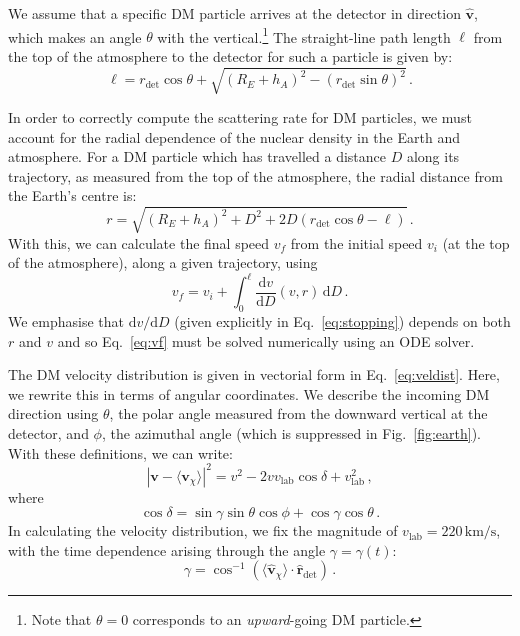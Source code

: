 \documentclass[prd,twocolumn,showpacs,nofootinbib,aps]{revtex4-1}
\begin{document}
We assume that a specific DM particle arrives at the detector in direction $\hat{\mathbf{v}}$, which makes an angle $\theta$ with the vertical.\footnote{Note that $\theta = 0$ corresponds to an \textit{upward}-going DM particle.} The straight-line path length $\ell$ from the top of the atmosphere to the detector for such a particle is given by:
\begin{equation}
\ell = r_\mathrm{det} \cos\theta + \sqrt{(R_E + h_A)^2 - (r_\mathrm{det} \sin\theta)^2 }\,.
\end{equation}

In order to correctly compute the scattering rate for DM particles, we must account for the radial dependence of the nuclear density in the Earth and atmosphere. For a DM particle which has travelled a distance $D$ along its trajectory, as measured from the top of the atmosphere, the radial distance from the Earth's centre is:
\begin{equation}
r = \sqrt{(R_E + h_A)^2 + D^2 + 2D(r_\mathrm{det}\cos\theta - \ell)}\,.
\end{equation}
With this, we can calculate the final speed $v_f$ from the initial speed $v_i$ (at the top of the atmosphere), along a given trajectory, using
\begin{equation}
\label{eq:vf}
v_f = v_i + \int_0^{\ell} \frac{\mathrm{d}v}{\mathrm{d}D}(v, r) \,\mathrm{d}D\,.
\end{equation}
We emphasise that  $\mathrm{d}v/\mathrm{d}D$ (given explicitly in Eq.~\eqref{eq:stopping}) depends on both $r$ and $v$ and so Eq.~\eqref{eq:vf} must be solved numerically using an ODE solver.

The DM velocity distribution is given in vectorial form in Eq.~\eqref{eq:veldist}. Here, we rewrite this in terms of angular coordinates. We describe the incoming DM direction using $\theta$, the polar angle measured from the downward vertical at the detector, and $\phi$, the azimuthal angle (which is suppressed in Fig.~\ref{fig:earth}). With these definitions, we can write:
\begin{equation}
|\mathbf{v} - \langle \mathbf{v}_\chi\rangle|^2 = v^2 - 2vv_\mathrm{lab} \cos\delta + v_\mathrm{lab}^2\,,
\end{equation}
where 
\begin{equation}
\cos\delta = \sin\gamma \sin\theta \cos\phi + \cos\gamma \cos\theta\,.
\end{equation}
In calculating the velocity distribution, we fix the magnitude of $v_\mathrm{lab} = 220 \,\mathrm{km/s}$, with the time dependence arising through the angle $\gamma = \gamma(t)$:
\begin{equation}
\gamma = \cos^{-1}\left(\langle \hat{\mathbf{v}}_\chi\rangle \cdot \hat{\mathbf{r}}_\mathrm{det}\right)\,.
\end{equation}
\end{document}
